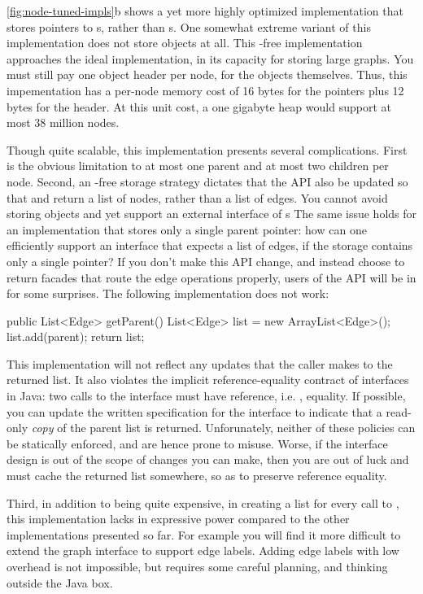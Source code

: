 \autoref{fig:node-tuned-impls}b shows a yet more highly optimized 
implementation that stores pointers to s, rather than s.
One somewhat extreme variant of this implementation does not store 
objects at all. This -free implementation approaches the ideal
implementation, in its capacity for storing large graphs. You must still pay one
object header per node, for the  objects themselves. Thus, this
impementation has a per-node memory cost of 16 bytes for the pointers plus 12
bytes for the header. At this unit cost, a one gigabyte heap would support at
most 38 million nodes.

Though quite scalable, this implementation presents several complications. First
is the obvious limitation to at most one parent and at most two children per
node. Second, an -free storage strategy dictates that the
 API also be updated so that  and
 return a list of nodes, rather than a list of edges. You
cannot avoid storing  objects and yet support an external interface
of s The same issue holds for an implementation that stores only a
single parent pointer: how can one efficiently support an interface that expects
a list of edges, if the storage contains only a single pointer? If you don't make
this API change, and instead choose to return facades that route the edge
operations properly, users of the API will be in for some surprises. The
following implementation does not work:
\begin{shortlisting}
public List<Edge> getParent() {
   List<Edge> list = new ArrayList<Edge>();
   list.add(parent);
   return list;
}
\end{shortlisting}
This implementation will not reflect any updates that the caller makes to the
returned list. It also violates the implicit reference-equality contract of
interfaces in Java: two calls to the  interface must have
reference, i.e. \code{==}, equality. If possible, you can update
the written specification for the interface to indicate that a read-only
\emph{copy} of the parent list is returned. Unforunately, neither of these
policies can be statically enforced, and are hence prone to misuse.
Worse, if the interface design is out of the
scope of changes you can make, then you are out of luck and must cache the
returned list somewhere, so as to preserve reference equality.

Third, in addition to being quite expensive, in creating a list for every call to
, this implementation lacks in expressive power compared to the
other implementations presented so far. For example you will find it more
difficult to extend the graph interface to support edge labels. Adding edge
labels with low overhead is not impossible, but requires some careful planning,
and thinking outside the Java box.

